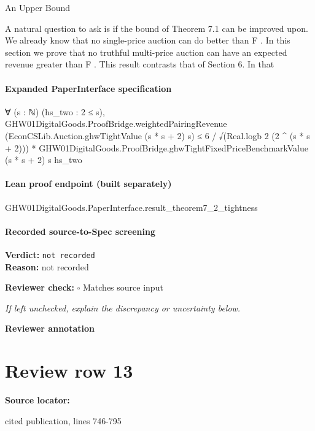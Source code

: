 \documentclass[10pt]{article}
\newcommand{\reviewerbox}{%
  \par\noindent\fbox{\parbox{0.96\linewidth}{\rule{0pt}{0.38in}}}\par
}
\newcommand{\reviewmatch}[1]{%
  \par\noindent\textbf{Reviewer check:} $\square$\; #1\par
  \noindent\emph{If left unchecked, explain the discrepancy or uncertainty below.}\par
}
\begin{document}
\begin{ReviewVerbatim}
An Upper Bound

A natural question to ask is if the bound of Theorem 7.1 can be improved upon. We already know
that no single-price auction can do better than F .
In this section we prove that no truthful multi-price
auction can have an expected revenue greater than
F . This result contrasts that of Section 6. In that
\end{ReviewVerbatim}


\paragraph{Expanded PaperInterface specification}
\begin{ReviewVerbatim}
∀ (s : ℕ) (hs_two : 2 ≤ s),
  GHW01DigitalGoods.ProofBridge.weightedPairingRevenue (EconCSLib.Auction.ghwTightValue (s * s + 2) s) ≤
    6 / √(Real.logb 2 (2 ^ (s * s + 2))) *
      GHW01DigitalGoods.ProofBridge.ghwTightFixedPriceBenchmarkValue (s * s + 2) s hs_two
\end{ReviewVerbatim}

\paragraph{Lean proof endpoint (built separately)}\begin{ReviewVerbatim}
GHW01DigitalGoods.PaperInterface.result_theorem7_2_tightness
\end{ReviewVerbatim}

\paragraph{Recorded source-to-Spec screening}
\textbf{Verdict:} \texttt{not recorded}
\\
\textbf{Reason:} not recorded
\reviewmatch{Matches source input}
\noindent\textbf{Reviewer annotation}\par
\reviewerbox
\clearpage
\hypertarget{source-claim-16eee1e38ed670e7}{}
\section*{Review row 13}
\textbf{Source locator:} {\footnotesize\raggedright cited publication, lines 746-\allowbreak{}795\par}
\end{document}
